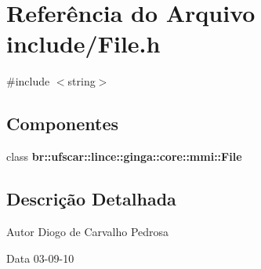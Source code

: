 \section{Referência do Arquivo include/File.h}
\label{File_8h}
{\ttfamily \#include $<$string$>$}\par
\subsection*{Componentes}
\begin{DoxyCompactItemize}
\item 
class {\bf br::ufscar::lince::ginga::core::mmi::File}
\end{DoxyCompactItemize}


\subsection{Descrição Detalhada}
\begin{DoxyAuthor}{Autor}
Diogo de Carvalho Pedrosa 
\end{DoxyAuthor}
\begin{DoxyDate}{Data}
03-\/09-\/10 
\end{DoxyDate}
